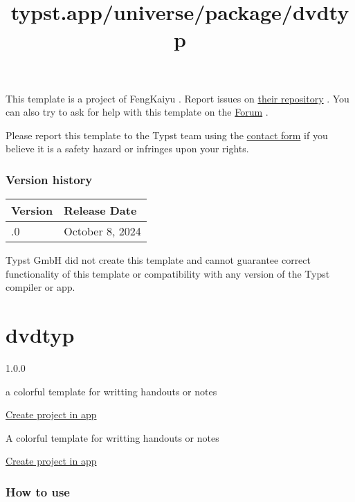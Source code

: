 This template is a project of FengKaiyu . Report issues on
\href{https://github.com/fky2015/resume-ng-typst}{their repository} .
You can also try to ask for help with this template on the
\href{https://forum.typst.app}{Forum} .

Please report this template to the Typst team using the
\href{https://typst.app/contact}{contact form} if you believe it is a
safety hazard or infringes upon your rights.

\label{versions}
\subsubsection{Version history}\label{version-history}

\begin{longtable}[]{@{}ll@{}}
\toprule\noalign{}
Version & Release Date \\
\midrule\noalign{}
\endhead
\bottomrule\noalign{}
\endlastfoot
1.0.0 & October 8, 2024 \\
\end{longtable}

Typst GmbH did not create this template and cannot guarantee correct
functionality of this template or compatibility with any version of the
Typst compiler or app.


\title{typst.app/universe/package/dvdtyp}

\label{banner}
\label{template-thumbnail}

\section{dvdtyp}\label{dvdtyp}

{ 1.0.0 }

a colorful template for writting handouts or notes

\href{/app?template=dvdtyp&version=1.0.0}{Create project in app}

\label{readme}
A colorful template for writting handouts or notes


\href{/app?template=dvdtyp&version=1.0.0}{Create project in app}

\subsubsection{How to use}\label{how-to-use}

